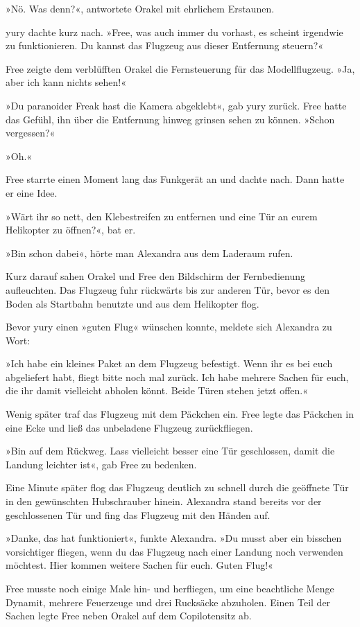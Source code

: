 »Nö. Was denn?«, antwortete Orakel mit ehrlichem Erstaunen.

yury dachte kurz nach. »Free, was auch immer du vorhast, es scheint irgendwie zu funktionieren. Du kannst das Flugzeug aus dieser Entfernung steuern?«

Free zeigte dem verblüfften Orakel die Fernsteuerung für das Modellflugzeug. »Ja, aber ich kann nichts sehen!«

»Du paranoider Freak hast die Kamera abgeklebt«, gab yury zurück. Free hatte das Gefühl, ihn über die Entfernung hinweg grinsen sehen zu können. »Schon vergessen?«

»Oh.«

Free starrte einen Moment lang das Funkgerät an und dachte nach. Dann hatte er eine Idee.

»Wärt ihr so nett, den Klebestreifen zu entfernen und eine Tür an eurem Helikopter zu öffnen?«, bat er.

»Bin schon dabei«, hörte man Alexandra aus dem Laderaum rufen.

Kurz darauf sahen Orakel und Free den Bildschirm der Fernbedienung aufleuchten. Das Flugzeug fuhr rückwärts bis zur anderen Tür, bevor es den Boden als Startbahn benutzte und aus dem Helikopter flog.

Bevor yury einen »guten Flug« wünschen konnte, meldete sich Alexandra zu Wort:

»Ich habe ein kleines Paket an dem Flugzeug befestigt. Wenn ihr es bei euch abgeliefert habt, fliegt bitte noch mal zurück. Ich habe mehrere Sachen für euch, die ihr damit vielleicht abholen könnt. Beide Türen stehen jetzt offen.«

Wenig später traf das Flugzeug mit dem Päckchen ein. Free legte das Päckchen in eine Ecke und ließ das unbeladene Flugzeug zurückfliegen.

»Bin auf dem Rückweg. Lass vielleicht besser eine Tür geschlossen, damit die Landung leichter ist«, gab Free zu bedenken.

Eine Minute später flog das Flugzeug deutlich zu schnell durch die geöffnete Tür in den gewünschten Hubschrauber hinein. Alexandra stand bereits vor der geschlossenen Tür und fing das Flugzeug mit den Händen auf.

»Danke, das hat funktioniert«, funkte Alexandra. »Du musst aber ein bisschen vorsichtiger fliegen, wenn du das Flugzeug nach einer Landung noch verwenden möchtest. Hier kommen weitere Sachen für euch. Guten Flug!«

Free musste noch einige Male hin- und herfliegen, um eine beachtliche Menge Dynamit, mehrere Feuerzeuge und drei Rucksäcke abzuholen. Einen Teil der Sachen legte Free neben Orakel auf dem Copilotensitz ab.

